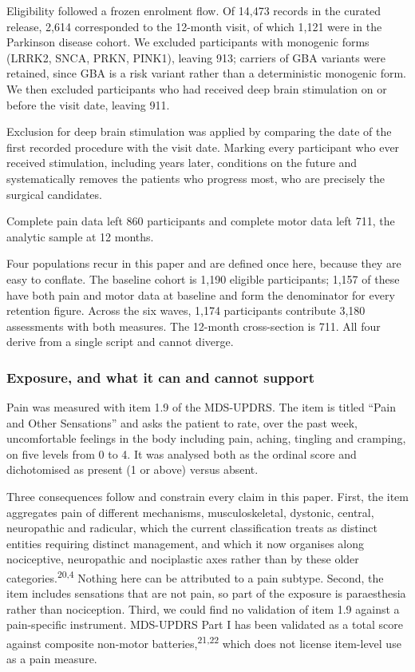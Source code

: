 \documentclass[
  english,
  12pt,
]{article}
\begin{document}
Eligibility followed a frozen enrolment flow. Of 14,473 records in the curated release, 2,614 corresponded to the 12-month visit, of which 1,121 were in the Parkinson disease cohort. We excluded participants with monogenic forms (LRRK2, SNCA, PRKN, PINK1), leaving 913; carriers of GBA variants were retained, since GBA is a risk variant rather than a deterministic monogenic form. We then excluded participants who had received deep brain stimulation on or before the visit date, leaving 911.

Exclusion for deep brain stimulation was applied by comparing the date of the first recorded procedure with the visit date. Marking every participant who ever received stimulation, including years later, conditions on the future and systematically removes the patients who progress most, who are precisely the surgical candidates.

Complete pain data left 860 participants and complete motor data left 711, the analytic sample at 12 months.

Four populations recur in this paper and are defined once here, because they are easy to conflate. The baseline cohort is 1,190 eligible participants; 1,157 of these have both pain and motor data at baseline and form the denominator for every retention figure. Across the six waves, 1,174 participants contribute 3,180 assessments with both measures. The 12-month cross-section is 711. All four derive from a single script and cannot diverge.

\subsubsection{Exposure, and what it can and cannot support}\label{exposure-and-what-it-can-and-cannot-support}

Pain was measured with item 1.9 of the MDS-UPDRS. The item is titled ``Pain and Other Sensations'' and asks the patient to rate, over the past week, uncomfortable feelings in the body including pain, aching, tingling and cramping, on five levels from 0 to 4. It was analysed both as the ordinal score and dichotomised as present (1 or above) versus absent.

Three consequences follow and constrain every claim in this paper. First, the item aggregates pain of different mechanisms, musculoskeletal, dystonic, central, neuropathic and radicular, which the current classification treats as distinct entities requiring distinct management, and which it now organises along nociceptive, neuropathic and nociplastic axes rather than by these older categories.\textsuperscript{20,4} Nothing here can be attributed to a pain subtype. Second, the item includes sensations that are not pain, so part of the exposure is paraesthesia rather than nociception. Third, we could find no validation of item 1.9 against a pain-specific instrument. MDS-UPDRS Part I has been validated as a total score against composite non-motor batteries,\textsuperscript{21,22} which does not license item-level use as a pain measure.
\end{document}
